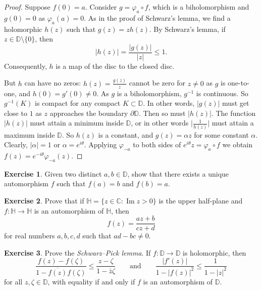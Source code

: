 \documentclass[12pt,openany]{book}
\renewcommand{\Im}{\operatorname{Im}}
\newcommand{\sabs}[1]{\lvert {#1} \rvert}
\newcommand{\babs}[1]{\bigl\lvert {#1} \bigr\rvert}
\newcommand{\abs}[1]{\left\lvert {#1} \right\rvert}
\newcommand{\C}{{\mathbb{C}}}
\newcommand{\D}{{\mathbb{D}}}
\newcommand{\bH}{{\mathbb{H}}}
\newcommand{\myindex}[1]{#1\index{#1}}
\theoremstyle{plain}
\theoremstyle{remark}
\theoremstyle{definition}
\newenvironment{exbox}{%
    \def\FrameCommand{\vrule width 1pt \relax\hspace{10pt}}%
    \MakeFramed{\advance\hsize-\width\FrameRestore}%
}{%
    \endMakeFramed
}
\theoremstyle{exercise}
\newtheorem{exercise}{Exercise}[section]
\theoremstyle{example}
\begin{document}
\begin{proof}
Suppose $f(0) = a$.
Consider $g = \varphi_a \circ f$, which is a biholomorphism
and $g(0) = 0$ as
$\varphi_a(a) = 0$.
As in the proof of Schwarz's lemma, we find a holomorphic $h(z)$
such that $g(z) = z h(z)$.  By
Schwarz's lemma, if $z \in \D \setminus \{ 0 \}$, then
\begin{equation*}
\sabs{h(z)} = \frac{\sabs{g(z)}}{\sabs{z}} \leq 1 .
\end{equation*}
Consequently, $h$ is a map of the disc to the closed disc.

But $h$ can have no zeros:
$h(z) = \frac{g(z)}{z}$ cannot be zero for $z \not= 0$ as $g$ is one-to-one,
and $h(0) = g'(0) \not= 0$.  As $g$ is a biholomorphism, $g^{-1}$ is
continuous. So $g^{-1}(K)$ is compact for any compact $K \subset \D$.
In other words, $\sabs{g(z)}$ must get close to $1$ as $z$
approaches the boundary $\partial \D$.  Then so must $\sabs{h(z)}$.
The function
$\sabs{h(z)}$ must attain a minimum inside $\D$, or in other
words $\babs{\frac{1}{h(z)}}$ must attain a maximum inside $\D$.  So $h(z)$
is a constant, and $g(z) = \alpha z$ for some constant $\alpha$.
Clearly, 
$\sabs{\alpha} = 1$ or $\alpha = e^{i\theta}$.  Applying
$\varphi_{-a}$ to both sides of $e^{i\theta} z = \varphi_a \circ f$
we obtain $f(z) = e^{-i\theta} \varphi_{-a}(z)$.
\end{proof}

\begin{exbox}
\begin{exercise}
Given two distinct $a,b \in \D$, show that there exists a unique automorphism
$f$ such that $f(a) = b$ and $f(b) = a$.
\end{exercise}

\begin{exercise}
Prove that if $\bH = \{ z \in \C : \Im z > 0 \}$ is the upper half-plane
and $f \colon \bH \to \bH$ is an automorphism of $\bH$, then
\begin{equation*}
f(z) = \frac{a z +b}{c z + d}
\end{equation*}
for real numbers $a,b,c,d$ such that $ad-bc \not= 0$.
\end{exercise}

\begin{exercise}
Prove the \emph{\myindex{Schwarz--Pick lemma}}.
If $f \colon \D \to \D$ is holomorphic, then
\begin{equation*}
\frac{f(z)-f(\zeta)}{1-\overline{f(z)}f(\zeta)} \leq
\frac{z-\zeta}{1-\bar{z}\zeta} 
\qquad
\text{and}
\qquad
\frac{\abs{f'(z)}}{1-\abs{f(z)}^2} \leq
\frac{1}{1-\abs{z}^2}
\end{equation*}
for all $z,\zeta \in \D$,
with equality if and only if $f$ is an automorphism of $\D$.
\end{exercise}
\end{exbox}
\end{document}
